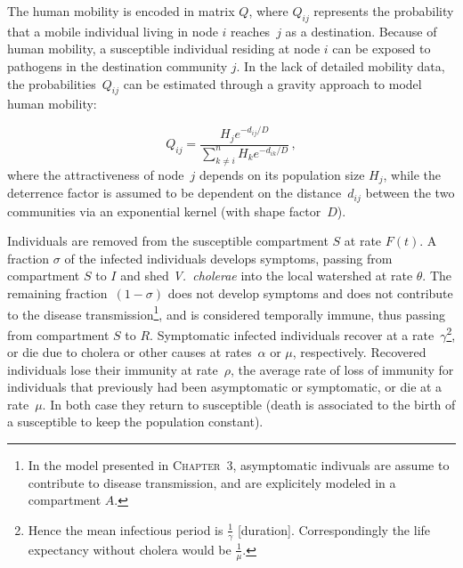 The human mobility is encoded in matrix $Q$, where $Q_{ij}$ represents the probability that a mobile individual living in node $i$ reaches~$j$ as a destination. Because of human mobility, a susceptible individual residing at node $i$ can be exposed to pathogens in the destination community $j$. 
In the lack of detailed mobility data,  the probabilities~$Q_{ij}$ can be estimated through a gravity approach\cite{Erlander:GravityModelTransportation:1990} to model human mobility:

\begin{equation}
Q_{ij} = \frac{H_j e^{-d_{ij}/D}}{\sum_{k \neq i}^n H_k e^{-d_{ik}/D}} \, ,
\label{eq:mob}
\end{equation}
where the attractiveness of node~$j$ depends on its population size $H_j$, while the deterrence factor is assumed to be dependent on the distance~$d_{ij}$ between the two communities via an exponential kernel (with shape factor~$D$).  

Individuals are removed from the susceptible compartment $S$ at rate $F(t)$.  A fraction $\sigma$ of the infected individuals develops symptoms, passing from compartment $S$ to $I$ and shed \textit{V.~cholerae} into the local watershed at rate $\theta$.  The remaining fraction~$(1-\sigma)$ does not develop symptoms and does not contribute to the disease transmission\footnote{In the model presented in \textsc{Chapter~3}, asymptomatic indivuals are assume to contribute to disease transmission, and are explicitely modeled in a compartment $A$.}, and is considered temporally immune, thus passing from compartment $S$ to $R$.  Symptomatic infected individuals recover at a rate~$\gamma$\footnote{Hence the mean infectious period is $\frac{1}{\gamma}$ [duration]. Correspondingly the life expectancy without cholera would be $\frac{1}{\mu}$.}, or die due to cholera or other causes at rates~$\alpha$ or $\mu$, respectively.
Recovered individuals lose their immunity at rate~$\rho$, the average rate of loss of immunity for individuals that previously had been asymptomatic or symptomatic, or die at a rate~$\mu$. In both case they return to susceptible (death is associated to the birth of a susceptible to keep the population constant).

